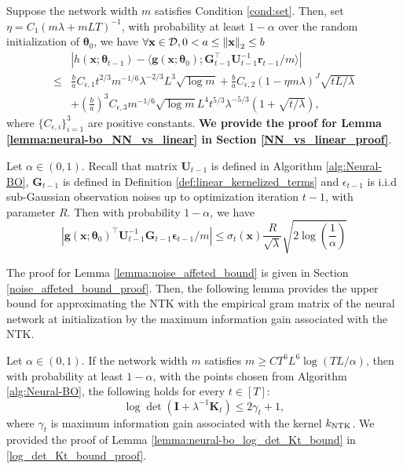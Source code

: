 \begin{auxlemma} 
\label{lemma:neural-bo_NN_vs_linear}
Suppose the network width $m$ satisfies Condition \ref{cond:set}.
Then, set $\eta = C_1(m\lambda + mLT)^{-1}$, with probability at least $1 - \alpha$ over the random initialization of $\boldsymbol{\theta}_0$, we have $\forall \mathbf{x} \in \mathcal{D}, 0 < a \leq \norm{\bf x}_2  \leq b$
\begin{equation*}
\begin{split}
    & \left \lvert h(\mathbf{x}; \boldsymbol{\theta}_{t-1})- \langle \mathbf{g}(\mathbf{x}; \boldsymbol{\theta}_0); \mathbf{G}_{t-1}^\top \mathbf{U}^{-1}_{t-1} \mathbf{r}_{t-1}/m \rangle \right\rvert \\ 
    \leq &  \frac{b}{a} C_{\epsilon,1} t^{2/3}m^{-1/6} \lambda^{-2/3} L^3 \sqrt{\log m} + \frac{b}{a} C_{\epsilon,2}(1 - \eta m \lambda)^J \sqrt{tL/ \lambda}\\
    & + \left(\frac{b}{a} \right)^3 C_{\epsilon,3} m^{-1/6} \sqrt{\log m} L^4 t^{5/3} \lambda ^{-5/3} \left(1 + \sqrt{t/\lambda} \right),
\end{split}
\end{equation*}
where $\{C_{\epsilon,i}\}_{i=1}^3$ are positive constants. \textbf{We provide the proof for Lemma \ref{lemma:neural-bo_NN_vs_linear} in Section \ref{NN_vs_linear_proof}}.
\end{auxlemma}

\begin{auxlemma}
\label{lemma:noise_affeted_bound}
Let $\alpha \in (0,1)$. Recall that matrix $\mathbf{U}_{t-1}$ is defined in Algorithm \ref{alg:Neural-BO}, $\mathbf{G}_{t-1}$ is defined in Definition \ref{def:linear_kernelized_terms} and $\epsilon_{t-1}$ is i.i.d sub-Gaussian  observation noises up to optimization iteration $t-1$, with parameter $R$. Then with probability  $1-\alpha$, we have
\[ \left\lvert \mathbf{g}(\mathbf{x}; \boldsymbol{\theta}_0)^\top \mathbf{U}^{-1}_{t-1} \mathbf{G}_{t-1} \boldsymbol{\epsilon}_{t-1}/m   \right\rvert \leq \sigma_t(\mathbf{x})\frac{R}{\sqrt{\lambda}} \sqrt{2 \log(\frac{1}{\alpha})}\]
\end{auxlemma}
The proof for Lemma \ref{lemma:noise_affeted_bound} is given in Section \ref{noise_affeted_bound_proof}. Then, the following lemma provides the upper bound for approximating the NTK with the empirical gram matrix of the neural network at initialization by the maximum information gain associated with the NTK. 

\begin{auxlemma}
\label{lemma:neural-bo_log_det_Kt_bound}
Let $\alpha \in (0,1)$. If the network width $m$ satisfies  $m \geq C T^6L^6 \log(TL/\alpha)$, then with probability at least $1-\alpha$, with the points chosen from Algorithm \ref{alg:Neural-BO}, the following holds for every $t \in [T]$:
\[ \log \det (\mathbf{I} + \lambda^{-1} \mathbf{K}_t) \le 2\gamma_t + 1,\]
where $\gamma_t$ is maximum information gain associated with the kernel $k_\textup{NTK}$. We provided the proof of Lemma \ref{lemma:neural-bo_log_det_Kt_bound} in \ref{log_det_Kt_bound_proof}.
\end{auxlemma}


